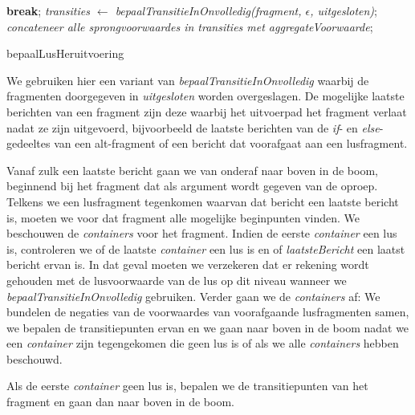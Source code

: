 \begin{algorithm}
{{{{{{	}{
	\textbf{break};}
	}}
	{
	\textit{transities $\leftarrow$ bepaalTransitieInOnvolledig(fragment, $\epsilon$, uitgesloten)}; \\
	\textit{concateneer alle sprongvoorwaardes in transities met aggregateVoorwaarde}; \\
	}
	}
	}}
	\caption{bepaalLusHeruitvoering}
	\label{alg:calculateLoopReentry}
\end{algorithm}

We gebruiken hier een variant van \textit{bepaalTransitieInOnvolledig} waarbij de fragmenten doorgegeven in \textit{uitgesloten} worden overgeslagen.
De mogelijke laatste berichten van een fragment zijn deze waarbij het uitvoerpad het fragment verlaat nadat ze zijn uitgevoerd, bijvoorbeeld de laatste berichten van de \textit{if}- en \textit{else}-gedeeltes van een alt-fragment of een bericht dat voorafgaat aan een lusfragment.

Vanaf zulk een laatste bericht gaan we van onderaf naar boven in de boom, beginnend bij het fragment dat als argument wordt gegeven van de oproep. Telkens we een lusfragment tegenkomen waarvan dat bericht een laatste bericht is, moeten we voor dat fragment alle mogelijke beginpunten vinden. We beschouwen de \textit{containers} voor het fragment. Indien de eerste \textit{container} een lus is, controleren we of de laatste \textit{container} een lus is en of \textit{laatsteBericht} een laatst bericht ervan is. In dat geval moeten we verzekeren dat er rekening wordt gehouden met de lusvoorwaarde van de lus op dit niveau wanneer we \textit{bepaalTransitieInOnvolledig} gebruiken. Verder gaan we de \textit{containers} af: We bundelen de negaties van de voorwaardes van voorafgaande lusfragmenten samen, we bepalen de transitiepunten ervan en we gaan naar boven in de boom nadat we een \textit{container} zijn tegengekomen die geen lus is of als we alle \textit{containers} hebben beschouwd.

Als de eerste \textit{container} geen lus is, bepalen we de transitiepunten van het fragment en gaan dan naar boven in de boom.

